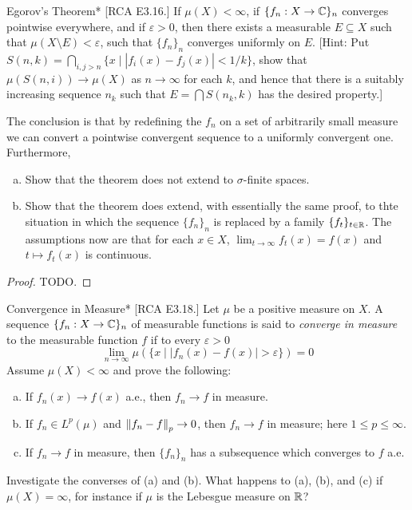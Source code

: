 \begin{problem}{Egorov's Theorem}*
    [RCA E3.16.] If \(\mu(X) < \infty\), if \(\{f_n : X \to \mathbb{C}\}_n\) converges pointwise everywhere, and if \(\varepsilon > 0\), then there exists a measurable \(E \subseteq X\) such that \(\mu(X \setminus E) < \varepsilon\), such that \(\{f_n\}_n\) converges uniformly on \(E\). [Hint: Put \(S(n, k) = \bigcap_{i,j > n} \{x \mid |f_i(x) - f_j(x)| < 1/k\}\), show that \(\mu(S(n, i)) \to \mu(X)\) as \(n \to \infty\) for each \(k\), and hence that there is a suitably increasing sequence \(n_k\) such that \(E = \bigcap S(n_k, k)\) has the desired property.] 
    \stdvspace

    The conclusion is that by redefining the \(f_n\) on a set of arbitrarily small measure we can convert a pointwise convergent sequence to a uniformly convergent one. Furthermore, 
    \begin{enumerate}[(a)]
        \itemsep0em
        \item Show that the theorem does not extend to \(\sigma\)-finite spaces. 
        \item Show that the theorem does extend, with essentially the same proof, to thte situation in which the sequence \(\{f_n\}_n\) is replaced by a family \(\{f_t\}_{t \in \mathbb{R}}\). The assumptions now are that for each \(x \in X\), \(\lim_{t \to \infty} f_t(x) = f(x)\) and \(t \mapsto f_t(x)\) is continuous. 
    \end{enumerate}
\end{problem}

\begin{proof}
    TODO. 
\end{proof}


\begin{problem}{Convergence in Measure}*
    [RCA E3.18.] Let \(\mu\) be a positive measure on \(X\). A sequence \(\{f_n : X \to \mathbb{C}\}_n\) of measurable functions is said to \emph{converge in measure} to the measurable function \(f\) if to every \(\varepsilon > 0\)
    \[
        \lim_{n \to \infty} \mu( \{ x \mid |f_n(x) - f(x)| > \varepsilon \} ) = 0
    \]
    Assume \(\mu(X) < \infty\) and prove the following: 
    \begin{enumerate}[(a)]
        \itemsep0em
        \item If \(f_n(x) \to f(x)\) a.e., then \(f_n \to f\) in measure. 
        \item If \(f_n \in L^p(\mu)\) and \(\norm{f_n - f}_p \to 0\), then \(f_n \to f\) in measure; here \(1 \leq p \leq \infty\). 
        \item If \(f_n \to f\) in measure, then \(\{f_n\}_n\) has a subsequence which converges to \(f\) a.e. 
    \end{enumerate}

    Investigate the converses of (a) and (b). What happens to (a), (b), and (c) if \(\mu(X) = \infty\), for instance if \(\mu\) is the Lebesgue measure on \(\mathbb{R}\)? 
\end{problem}


